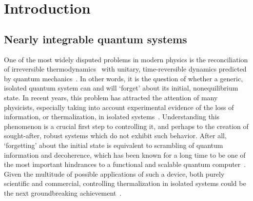 \chapter{Introduction\label{chap:intro}}
\thispagestyle{chapterBeginStyle}

\section{Nearly integrable quantum systems}
One of the most widely disputed problems in modern physics is the reconciliation
of irreversible thermodynamics~\autocite{huang1987statistical,feynman1998statistical}
with unitary, time-reversible dynamics predicted by quantum mechanics~\autocite{Landau1976, Sakurai2017}.
In other words, it is the question of whether a generic, isolated quantum system can and will `forget' about its
initial, nonequilibrium state. In recent years, this problem has attracted the attention of many physicists,
especially taking into account experimental evidence of the loss of information, or thermalization, in isolated
systems~\autocite{Trotzky2012325, Rigol2012, Rigol2008854, Hung2010, Hofferberth2007}. Understanding this phenomenon is a crucial first step to
controlling it, and perhaps to the creation of sought-after, robust systems which do not exhibit such
behavior. After all, `forgetting' about the initial state is equivalent to scrambling of quantum information
and decoherence, which has been known for a long time to be one of the most important hindrances
to a functional and scalable quantum computer~\autocite{Shor1995, LewisSwan2019}. Given the multitude
of possible applications of such a device, both purely scientific and commercial, controlling thermalization
in isolated systems could be the next groundbreaking achievement~\autocite{MacQuarrie2020}.

